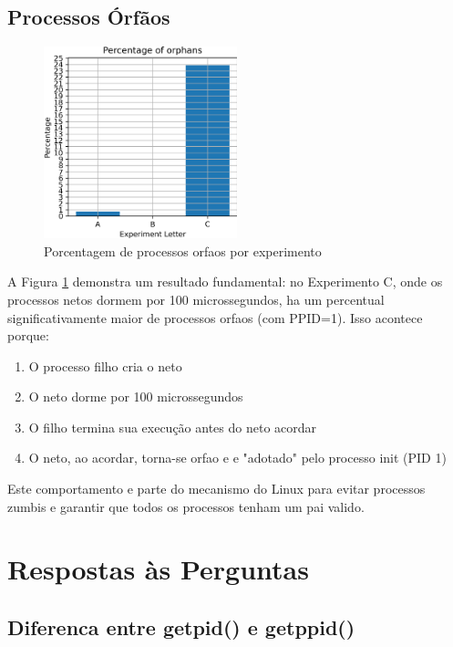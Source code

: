 \documentclass[12pt]{article}
\begin{document}
\subsection{Processos Órfãos}

\begin{figure}[h]
    \centering
    \includegraphics[width=0.5\textwidth]{figures/orphans.png}
    \caption{Porcentagem de processos orfaos por experimento}
    \label{fig:orphans}
\end{figure}

A Figura \ref{fig:orphans} demonstra um resultado fundamental: no Experimento C, onde os processos netos dormem por 100 microssegundos, ha um percentual significativamente maior de processos orfaos (com PPID=1). Isso acontece porque:

\begin{enumerate}
    \item O processo filho cria o neto
    \item O neto dorme por 100 microssegundos
    \item O filho termina sua execução antes do neto acordar
    \item O neto, ao acordar, torna-se orfao e e "adotado" pelo processo init (PID 1)
\end{enumerate}

Este comportamento e parte do mecanismo do Linux para evitar processos zumbis e garantir que todos os processos tenham um pai valido.

\section{Respostas às Perguntas}

\subsection{Diferenca entre getpid() e getppid()}
\end{document}
